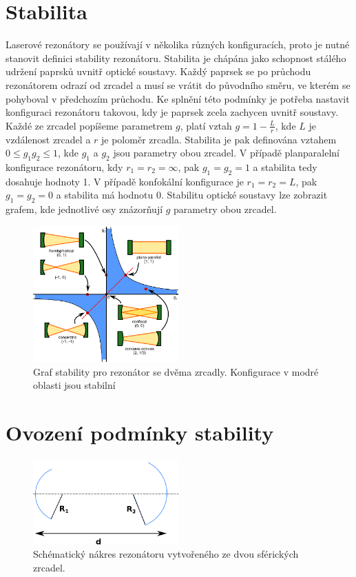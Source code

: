 \documentclass[a4paper,12pt]{article}
\begin{document}
\section{Stabilita}
Laserové rezonátory se používají v několika různých konfiguracích, proto je nutné stanovit definici stability rezonátoru. Stabilita je chápána jako schopnost stálého udržení paprsků uvnitř optické soustavy. Každý paprsek se po průchodu rezonátorem odrazí od zrcadel a musí se vrátit do původního směru, ve kterém se pohyboval v předchozím průchodu. Ke splnění této podmínky je potřeba nastavit konfiguraci rezonátoru takovou, kdy je paprsek zcela zachycen uvnitř soustavy. Každé ze zrcadel popíšeme parametrem $g$, platí vztah $g=1-\frac{L}{r}$, kde $L$ je vzdálenost zrcadel a $r$ je poloměr zrcadla. Stabilita je pak definována vztahem $0 \leq g_1g_2 \leq 1$, kde $g_1$ a $g_2$ jsou parametry obou zrcadel. V případě planparalelní konfigurace rezonátoru, kdy $r_1 = r_2 = \infty$, pak $g_1 = g_2 = 1$ a stabilita tedy dosahuje hodnoty 1.
V případě konfokální konfigurace je $r_1 = r_2 = L$, pak $g_1 = g_2 = 0$ a stabilita má hodnotu 0.
Stabilitu optické soustavy lze zobrazit grafem, kde jednotlivé osy znázorňují $g$ parametry obou zrcadel.



\begin{figure}[h!]
  \centering
    \includegraphics[width=0.5\textwidth]{images/image03.png}
\caption{Graf stability pro rezonátor se dvěma zrcadly. Konfigurace v modré oblasti jsou stabilní \cite{cavity}}
\end{figure}


\section{Ovození podmínky stability}


\begin{figure}[h!]
  \centering
    \includegraphics[width=0.5\textwidth]{images/image04.png}
\caption{Schématický nákres rezonátoru vytvořeného ze dvou sférických zrcadel.}
\end{figure}
\end{document}
